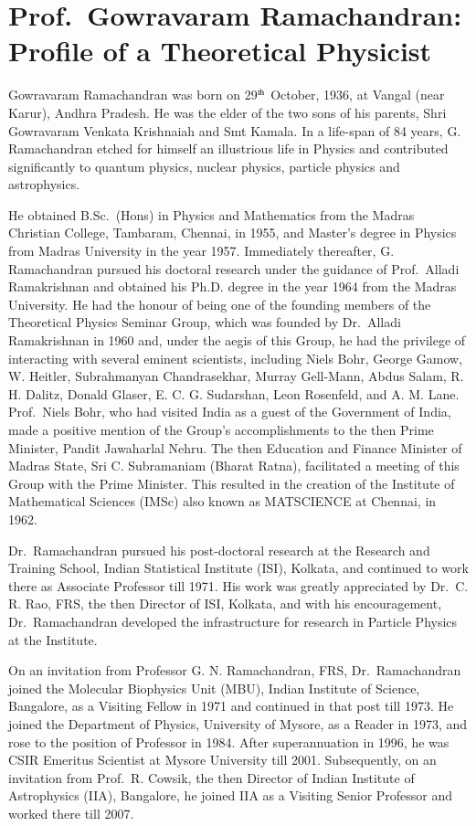 \chapter{Prof.\ Gowravaram Ramachandran: Profile of a Theoretical Physicist}\label{chap37}

Gowravaram Ramachandran was born on 29$^{\rm th}$ October, 1936, at Vangal (near Karur), Andhra Pradesh. He was the elder of the two sons of his parents, Shri Gowravaram Venkata Krishnaiah and Smt Kamala. In a life-span of 84 years, G. Ramachandran etched for himself an illustrious life in Physics and contributed significantly to quantum physics, nuclear physics, particle physics and astrophysics.
 
He obtained B.Sc.\ (Hons) in Physics and Mathematics from the Madras Christian College, Tambaram, Chennai, in 1955, and Master's degree in Physics from Madras University in the year 1957. Immediately thereafter, G. Ramachandran pursued his doctoral research under the guidance of Prof.\ Alladi Ramakrishnan and obtained his Ph.D. degree in the year 1964 from the Madras University. He had the honour of being one of the founding members of the Theoretical Physics Seminar Group, which was founded by Dr.\ Alladi Ramakrishnan in 1960 and, under the aegis of this Group, he had the privilege of interacting with several eminent scientists, including Niels Bohr, George Gamow, W. Heitler,  Subrahmanyan Chandrasekhar, Murray Gell-Mann, Abdus Salam, R. H. Dalitz, Donald Glaser, E. C. G. Sudarshan, Leon Rosenfeld, and A. M. Lane. Prof.\ Niels Bohr, who had visited India as a guest of the Government of India, made a positive mention of the Group's accomplishments to the then Prime Minister, Pandit Jawaharlal Nehru. The then Education and Finance Minister of Madras State, Sri C. Subramaniam (Bharat Ratna), facilitated a meeting of this Group with the Prime Minister. This resulted in the creation of the Institute of Mathematical Sciences (IMSc) also known as MATSCIENCE at Chennai, in 1962.
 
Dr.\ Ramachandran pursued his post-doctoral research at the Research and Training School, Indian Statistical Institute (ISI), Kolkata, and continued to work there as Associate Professor till 1971. His work was greatly appreciated by Dr.\ C. R. Rao, FRS, the then Director of ISI, Kolkata, and with his encouragement, Dr.\ Ramachandran developed the infrastructure for research in Particle Physics at the Institute.
 
On an invitation from Professor G. N. Ramachandran, FRS, Dr.\ Ramachandran joined the Molecular Biophysics Unit (MBU), Indian Institute of Science, Bangalore, as a Visiting Fellow in 1971 and continued in that post till 1973. He joined the Department of Physics, University of Mysore, as a Reader in 1973, and rose to the position of Professor in 1984. After superannuation in 1996, he was CSIR Emeritus Scientist at Mysore University till 2001. Subsequently, on an invitation from Prof.\ R. Cowsik, the then Director of Indian Institute of Astrophysics (IIA), Bangalore, he joined IIA as a Visiting Senior Professor and worked there till 2007.
 
